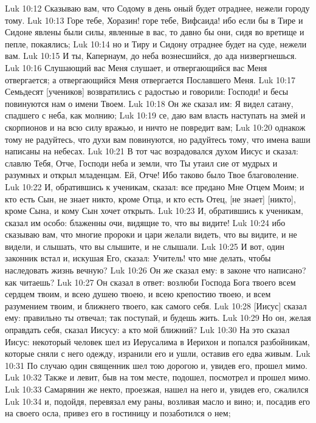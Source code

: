 Luk 10:12  Сказываю вам, что Содому в день оный будет отраднее, нежели городу тому.
Luk 10:13  Горе тебе, Хоразин! горе тебе, Вифсаида! ибо если бы в Тире и Сидоне явлены были силы, явленные в вас, то давно бы они, сидя во вретище и пепле, покаялись;
Luk 10:14  но и Тиру и Сидону отраднее будет на суде, нежели вам.
Luk 10:15  И ты, Капернаум, до неба вознесшийся, до ада низвергнешься.
Luk 10:16  Слушающий вас Меня слушает, и отвергающийся вас Меня отвергается; а отвергающийся Меня отвергается Пославшего Меня.
Luk 10:17  Семьдесят [учеников] возвратились с радостью и говорили: Господи! и бесы повинуются нам о имени Твоем.
Luk 10:18  Он же сказал им: Я видел сатану, спадшего с неба, как молнию;
Luk 10:19  се, даю вам власть наступать на змей и скорпионов и на всю силу вражью, и ничто не повредит вам;
Luk 10:20  однакож тому не радуйтесь, что духи вам повинуются, но радуйтесь тому, что имена ваши написаны на небесах.
Luk 10:21  В тот час возрадовался духом Иисус и сказал: славлю Тебя, Отче, Господи неба и земли, что Ты утаил сие от мудрых и разумных и открыл младенцам. Ей, Отче! Ибо таково было Твое благоволение.
Luk 10:22  И, обратившись к ученикам, сказал: все предано Мне Отцем Моим; и кто есть Сын, не знает никто, кроме Отца, и кто есть Отец, [не знает] [никто], кроме Сына, и кому Сын хочет открыть.
Luk 10:23  И, обратившись к ученикам, сказал им особо: блаженны очи, видящие то, что вы видите!
Luk 10:24  ибо сказываю вам, что многие пророки и цари желали видеть, что вы видите, и не видели, и слышать, что вы слышите, и не слышали.
Luk 10:25  И вот, один законник встал и, искушая Его, сказал: Учитель! что мне делать, чтобы наследовать жизнь вечную?
Luk 10:26  Он же сказал ему: в законе что написано? как читаешь?
Luk 10:27  Он сказал в ответ: возлюби Господа Бога твоего всем сердцем твоим, и всею душею твоею, и всею крепостию твоею, и всем разумением твоим, и ближнего твоего, как самого себя.
Luk 10:28  [Иисус] сказал ему: правильно ты отвечал; так поступай, и будешь жить.
Luk 10:29  Но он, желая оправдать себя, сказал Иисусу: а кто мой ближний?
Luk 10:30  На это сказал Иисус: некоторый человек шел из Иерусалима в Иерихон и попался разбойникам, которые сняли с него одежду, изранили его и ушли, оставив его едва живым.
Luk 10:31  По случаю один священник шел тою дорогою и, увидев его, прошел мимо.
Luk 10:32  Также и левит, быв на том месте, подошел, посмотрел и прошел мимо.
Luk 10:33  Самарянин же некто, проезжая, нашел на него и, увидев его, сжалился
Luk 10:34  и, подойдя, перевязал ему раны, возливая масло и вино; и, посадив его на своего осла, привез его в гостиницу и позаботился о нем;
